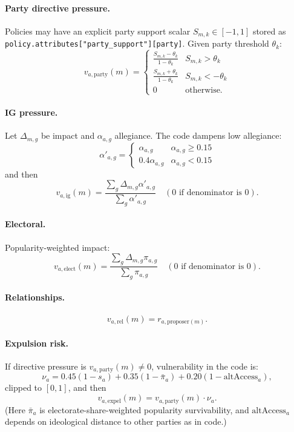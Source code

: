 \documentclass[11pt]{article}
\begin{document}
\paragraph{Party directive pressure.}
Policies may have an explicit party support scalar $S_{m,k}\in[-1,1]$ stored as
\texttt{policy.attributes["party\_support"][party]}.
Given party threshold $\theta_k$:
\[
  v_{a,\text{party}}(m) =
  \begin{cases}
    \frac{S_{m,k}-\theta_k}{1-\theta_k} & S_{m,k}>\theta_k \\
    \frac{S_{m,k}+\theta_k}{1-\theta_k} & S_{m,k}<-\theta_k \\
    0 & \text{otherwise.}
  \end{cases}
\]

\paragraph{IG pressure.}
Let $\Delta_{m,g}$ be impact and $\alpha_{a,g}$ allegiance. The code dampens low allegiance:
\[
  \alpha'_{a,g} =
  \begin{cases}
    \alpha_{a,g} & \alpha_{a,g}\ge 0.15\\
    0.4\alpha_{a,g} & \alpha_{a,g}<0.15
  \end{cases}
\]
and then
\[
  v_{a,\text{ig}}(m) = \frac{\sum_g \Delta_{m,g}\alpha'_{a,g}}{\sum_g \alpha'_{a,g}}
  \quad (\text{0 if denominator is 0}).
\]

\paragraph{Electoral.}
Popularity-weighted impact:
\[
  v_{a,\text{elect}}(m) = \frac{\sum_g \Delta_{m,g}\pi_{a,g}}{\sum_g \pi_{a,g}}
  \quad (\text{0 if denominator is 0}).
\]

\paragraph{Relationships.}
\[
  v_{a,\text{rel}}(m) = r_{a,\text{proposer}(m)}.
\]

\paragraph{Expulsion risk.}
If directive pressure is $v_{a,\text{party}}(m)\neq 0$, vulnerability in the code is:
\[
  \nu_a = 0.45(1-s_a) + 0.35(1-\bar{\pi}_a) + 0.20(1-\text{altAccess}_a),
\]
clipped to $[0,1]$, and then
\[
  v_{a,\text{expel}}(m)= v_{a,\text{party}}(m)\cdot \nu_a.
\]
(Here $\bar{\pi}_a$ is electorate-share-weighted popularity survivability, and $\text{altAccess}_a$
depends on ideological distance to other parties as in code.)
\end{document}
